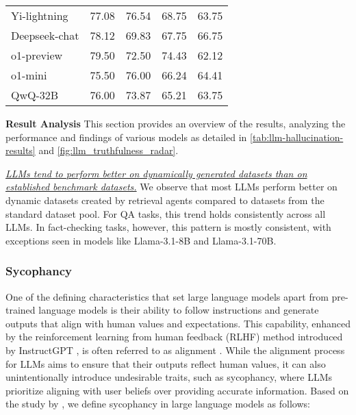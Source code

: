 \begin{table}
\begin{tabular}{@{}lcccc@{}}
Yi-lightning      & 77.08   & 76.54     & 68.75     & 63.75   \\
Deepseek-chat     & 78.12   & 69.83     & 67.75     & 66.75   \\
o1-preview    & 79.50   & 72.50     & 74.43     & 62.12       \\
o1-mini       & 75.50   & 76.00     & 66.24     & 64.41       \\
QwQ-32B           & 76.00   & 73.87     & 65.21     & 63.75   \\
\bottomrule[1pt]
\end{tabular}
\label{tab:llm-hallucination-results}
\vspace{-15pt}
\end{table}


\textbf{Result Analysis} This section provides an overview of the results, analyzing the performance and findings of various models as detailed in \autoref{tab:llm-hallucination-results} and \autoref{fig:llm_truthfulness_radar}.


\textit{\ul{LLMs tend to perform better on dynamically generated datasets than on established benchmark datasets.}} We observe that most LLMs perform better on dynamic datasets created by retrieval agents compared to datasets from the standard dataset pool. For QA tasks, this trend holds consistently across all LLMs. In fact-checking tasks, however, this pattern is mostly consistent, with exceptions seen in models like Llama-3.1-8B and Llama-3.1-70B.


\subsubsection{Sycophancy}
\label{sec:sycophancy}
One of the defining characteristics that set large language models apart from pre-trained language models is their ability to follow instructions and generate outputs that align with human values and expectations. This capability, enhanced by the reinforcement learning from human feedback (RLHF) method introduced by InstructGPT \cite{ouyang2022training}, is often referred to as alignment \cite{shen2023large, wang2023aligning, Sun2024TrustLLMTI, hendrycks2023overview, park2023ai, steinhardt2023emergent}. While the alignment process for LLMs aims to ensure that their outputs reflect human values, it can also unintentionally introduce undesirable traits, such as sycophancy, where LLMs prioritize aligning with user beliefs over providing accurate information. Based on the study by \cite{sharma2023understanding}, we define sycophancy in large language models as follows:

